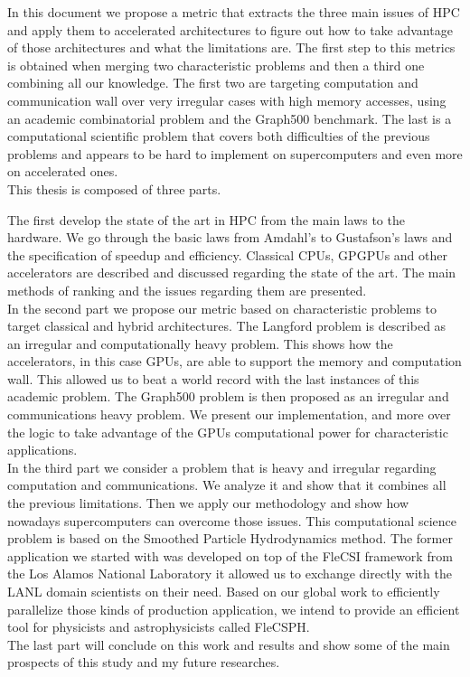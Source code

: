 In this document we propose a metric that extracts the three main issues of HPC and apply them to accelerated architectures to figure out how to take advantage of those architectures and what the limitations are. 
The first step to this metrics is obtained when merging two characteristic problems and then a third one combining all our knowledge.
The first two are targeting computation and communication wall over very irregular cases with high memory accesses, using an academic combinatorial problem and the Graph500 benchmark. 
The last is a computational scientific problem that covers both difficulties of the previous problems and appears to be hard to implement on supercomputers and even more on accelerated ones.\\

This thesis is composed of three parts.

The first develop the state of the art in HPC from the main laws to the hardware. 	
We go through the basic laws from Amdahl's to Gustafson's laws and the specification of speedup and efficiency.
Classical CPUs, GPGPUs and other accelerators are described and discussed regarding the state of the art. 
The main methods of ranking and the issues regarding them are presented.\\ 

In the second part we propose our metric based on characteristic problems to target classical and hybrid architectures.
The Langford problem is described as an irregular and computationally heavy problem.
This shows how the accelerators, in this case GPUs, are able to support the memory and computation wall. 
This allowed us to beat a world record with the last instances of this academic problem.
The Graph500 problem is then proposed as an irregular and communications heavy problem. 
We present our implementation, and more over the logic to take advantage of the GPUs computational power for characteristic applications. \\

In the third part we consider a problem that is heavy and irregular regarding computation and communications.
We analyze it and show that it combines all the previous limitations. 
Then we apply our methodology and show how nowadays supercomputers can overcome those issues. 
This computational science problem is based on the Smoothed Particle Hydrodynamics method.
The former application we started with was developed on top of the FleCSI framework from the Los Alamos National Laboratory it allowed us to exchange directly with the LANL domain scientists on their need.
Based on our global work to efficiently parallelize those kinds of production application, we intend to provide an efficient tool for physicists and astrophysicists called FleCSPH. \\

The last part will conclude on this work and results and show some of the main prospects of this study and my future researches. 